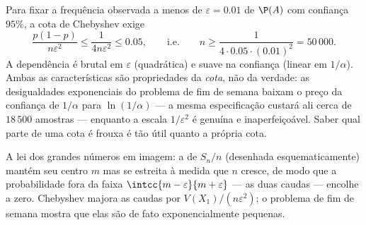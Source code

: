 \begin{example}\label{ex:b2:randomvar:llnnumeric}
Para fixar a frequência observada a menos de $\varepsilon = 0.01$ de
$\P(A)$ com confiança $95\%$, a cota de Chebyshev exige
\[
\frac{p(1-p)}{n\varepsilon^2} \leq \frac{1}{4n\varepsilon^2}
\leq 0.05,
\qquad\text{i.e.}\qquad
n \geq \frac{1}{4\cdot0.05\cdot(0.01)^2} = 50\,000 .
\]
A dependência é brutal em $\varepsilon$ (quadrática) e
suave na confiança (linear em $1/\alpha$). Ambas as características
são propriedades da \emph{cota}, não da verdade: as desigualdades
exponenciais do problema de fim de semana baixam o preço da
confiança de $1/\alpha$ para $\ln(1/\alpha)$ --- a mesma
especificação custará ali cerca de $18\,500$ amostras ---
enquanto a escala $1/\varepsilon^2$ é genuína e
inaperfeiçoável. Saber qual parte de uma cota é frouxa é tão
útil quanto a própria cota.
\end{example}

\begin{omfigure}

{\small A lei dos grandes números em imagem: a  de
$S_n/n$ (desenhada esquematicamente) mantém seu centro $m$ mas
se estreita à medida que $n$ cresce, de modo que a probabilidade fora da faixa
$\intcc{m-\varepsilon}{m+\varepsilon}$ --- as duas caudas ---
encolhe a zero. Chebyshev majora as caudas por
$V(X_1)/(n\varepsilon^2)$; o problema de fim de semana mostra que elas são
de fato exponencialmente pequenas.}
\end{omfigure}

